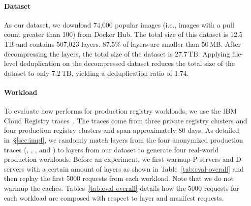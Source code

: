\paragraph{Dataset}
%
As our dataset, we download 74,000 popular images (i.e., images with a pull count greater than 100) from Docker Hub.
% 
The total size of this dataset is 12.5\,TB and contains 507,023 layers. 87.5\% of layers are smaller than 50\,MB.
%
After decompressing the layers, the total size of the dataset is 27.7\,TB.
%
Applying file-level deduplication on the decompressed dataset
reduces the total size of the dataset to only 7.2\,TB, yielding 
a deduplication ratio of 1.74.
%
%
  
\paragraph{Workload}
%
To evaluate how \sysname performs for production registry workloads, 
we use the IBM Cloud Registry traces~\cite{dockerworkload}.
%
The traces come from three private registry clusters and 
four production registry clusters and span approximately 80 days.
%
As detailed in~\S\ref{sec:impl}, we randomly match layers from the four anonymized production
traces (\dal, \fra, \lon, and \syd) to layers from our dataset to generate four real-world production workloads.
%
Before an experiment, we first warmup P-servers and D-servers with a certain amount of layers as shown in
Table~\ref{tab:eval-overall} and then replay the first 5000 requests from each workload.
Note that we do not warmup the caches.
%
%
Tables~\ref{tab:eval-overall} details how the 5000 requests for each workload are composed
with respect to layer and manifest requests.

